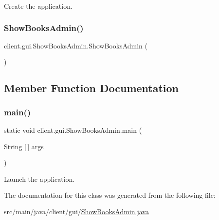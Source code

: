 Create the application. \mbox{\label{classclient_1_1gui_1_1_show_books_admin_a3cd50eea77571b56d9586c897bca3649}} 
\subsubsection{\texorpdfstring{Show\+Books\+Admin()}{ShowBooksAdmin()}\hspace{0.1cm}{\footnotesize\ttfamily [2/2]}}
{\footnotesize\ttfamily client.\+gui.\+Show\+Books\+Admin.\+Show\+Books\+Admin (\begin{DoxyParamCaption}{ }\end{DoxyParamCaption})}



\subsection{Member Function Documentation}
\mbox{\label{classclient_1_1gui_1_1_show_books_admin_aa020e3fa7d5aef20d7ab4bff2164fa75}} 
\subsubsection{\texorpdfstring{main()}{main()}}
{\footnotesize\ttfamily static void client.\+gui.\+Show\+Books\+Admin.\+main (\begin{DoxyParamCaption}\item[{String \mbox{[}$\,$\mbox{]}}]{args }\end{DoxyParamCaption})\hspace{0.3cm}{\ttfamily [static]}}

Launch the application. 

The documentation for this class was generated from the following file\+:\begin{DoxyCompactItemize}
\item 
src/main/java/client/gui/\hyperlink{_show_books_admin_8java}{Show\+Books\+Admin.\+java}\end{DoxyCompactItemize}
